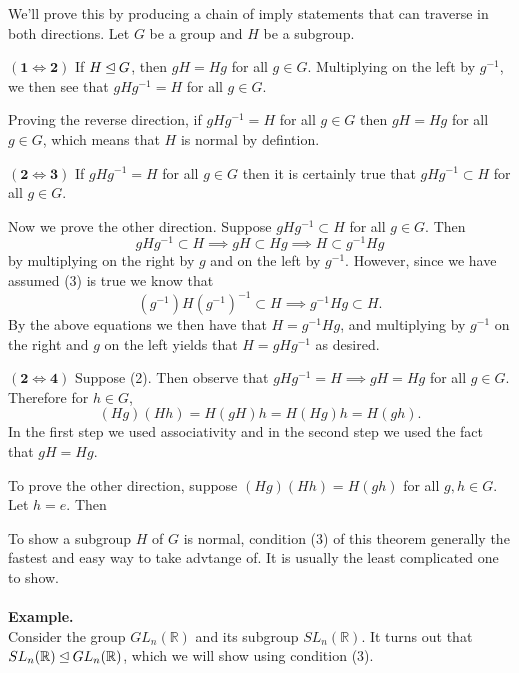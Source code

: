     \begin{prf}
        We'll prove this by producing a chain of imply statements that
        can traverse in both directions.
        Let $G$ be a group and $H$ be a subgroup. 
        
        \noindent $\mathbf{(1 \iff 2)}$ If $H \unlhd G$, then $gH = Hg$
        for all $g \in G$. Multiplying on the left by $g^{-1}$, we
        then see that $gHg^{-1} = H$ for all $g \in G$.

        Proving the reverse direction, if $gHg^{-1} = H$ for all $g \in G$
        then $gH = Hg$ for all $g \in G$, which means that $H$ is
        normal by defintion. 

        \noindent $\mathbf{(2 \iff 3)}$ If $gHg^{-1} = H$ for all $g \in G$
        then it is certainly true that $gHg^{-1} \subset H$ for all $g
        \in G$. 
        
        Now we prove the other direction. Suppose $gHg^{-1} \subset H$ for
        all $g \in G$. Then
        \[
            gHg^{-1} \subset H \implies gH \subset Hg 
            \implies H \subset g^{-1}Hg
        \]
        by multiplying on the right by $g$ and on the left by
        $g^{-1}$. However, since we have assumed (3) is true we know
        that 
        \[
            (g^{-1})H(g^{-1})^{-1} \subset H \implies g^{-1}Hg
            \subset H. 
        \] 
        By the above equations we then have that $H = g^{-1}Hg$, and
        multiplying by $g^{-1}$ on the right and $g$ on the left
        yields that $H = gHg^{-1}$ as desired.

        \noindent$\mathbf{(2 \iff 4)}$ Suppose (2). Then observe that $gHg^{-1} = H
        \implies gH = Hg$ for all $g \in G$.
        Therefore for $h \in G$, 
        \[
            (Hg)(Hh) = H(gH)h = H(Hg)h = H(gh).
        \]
        In the first step we used associativity and in the
        second step we used the fact that $gH = Hg$. 

        To prove the other direction, suppose $(Hg)(Hh) = H(gh)$ for
        all $g, h \in G$. Let $h = e$. Then 
    \end{prf}
    To show a subgroup $H$ of $G$ is normal, condition (3) of this
    theorem generally the fastest and easy way to take advtange of. It
    is usually the least complicated one to show. 
    \\
    \\
    \noindent
    \textbf{Example.}
    \\
    Consider the group $GL_n(\mathbb{R})$ and its subgroup
    $SL_n(\mathbb{R})$. It turns out that $SL_n(\mathbb{R}) \unlhd
    GL_n(\mathbb{R})$, which we will show using condition (3).

